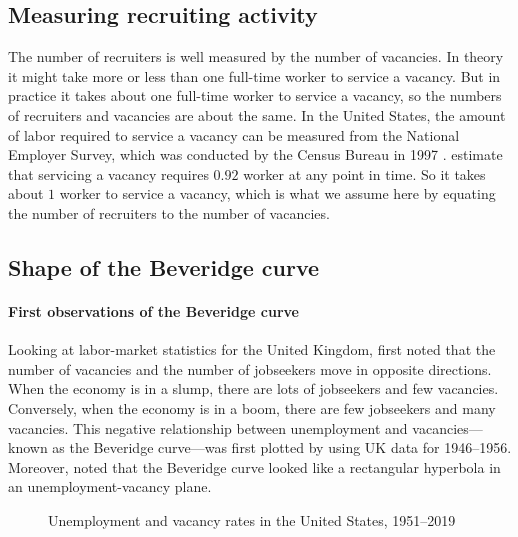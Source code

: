 \documentclass[letterpaper,12pt,leqno]{article}
\newcommand{\pdf}{../../figures/xsquareroot_202206.pdf}
\begin{document}
\subsection{Measuring recruiting activity} 

The number of recruiters is well measured by the number of vacancies. In theory it might take more or less than one full-time worker to service a vacancy. But in practice it takes about one full-time worker to service a vacancy, so the numbers of recruiters and vacancies are about the same. In the United States, the amount of labor required to service a vacancy can be measured from the National Employer Survey, which was conducted by the Census Bureau in 1997 \citep{V10}. \citet[p. 11]{MS16} estimate that servicing a vacancy requires $0.92$ worker at any point in time. So it takes about $1$ worker to service a vacancy, which is what we assume here by equating the number of recruiters to the number of vacancies.

\subsection{Shape of the Beveridge curve}

\paragraph{First observations of the Beveridge curve} Looking at labor-market statistics for the United Kingdom, \citet{B44} first noted that the number of vacancies and the number of jobseekers move in opposite directions. When the economy is in a slump, there are lots of jobseekers and few vacancies. Conversely, when the economy is in a boom, there are few jobseekers and many vacancies. This negative relationship between unemployment and vacancies---known as the Beveridge curve---was first plotted by \citet[figures 1 and 2]{DD58} using UK data for 1946--1956. Moreover, \citet[p. 22]{DD58} noted that the Beveridge curve looked like a rectangular hyperbola in an unemployment-vacancy plane.

\begin{figure}[t]
\hfill
{}
\caption{Unemployment and vacancy rates in the United States, 1951--2019}
\label{f:1951}\end{figure}
\end{document}
